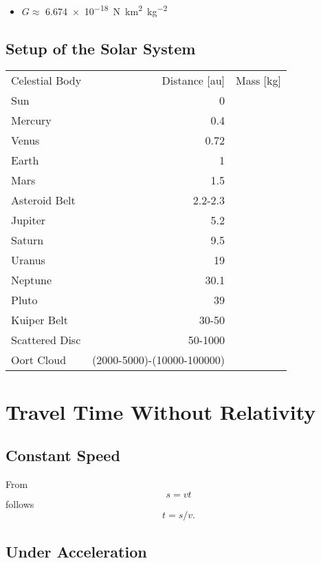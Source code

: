 \documentclass[10pt]{article}
\numberwithin{equation}{section}
\begin{document}
	\begin{itemize}
		\item $G \approx$ \SI{6.674e-18}{\N\km\squared\per\kg\squared}
	\end{itemize}
	
	\subsection{Setup of the Solar System}
	
	\begin{tabular}{l r r}
		Celestial Body & Distance [\unit{\astronomicalunit}] & Mass [\unit{\kg}]\\
		Sun & 0 & \\
		Mercury & 0.4 & \\
		Venus & 0.72 & \\
		Earth & 1 & \\
		Mars & 1.5 & \\
		Asteroid Belt & 2.2-2.3 & \\
		Jupiter & 5.2 & \\
		Saturn & 9.5 & \\
		Uranus & 19 & \\
		Neptune & 30.1 & \\
		Pluto & 39 & \\
		Kuiper Belt & 30-50 & \\
		Scattered Disc & 50-1000 & \\
		Oort Cloud & (2000-5000)-(\num{10000}-\num{100000}) & \\
	\end{tabular}
	
	\section{Travel Time Without Relativity}\label{TravelTime}
	
	\subsection{Constant Speed}
	
	From	
	\begin{equation}
		s = vt	\end{equation}	
	follows
	\begin{equation}
		t = s/v. \end{equation}
	
	\subsection{Under Acceleration}
	
\end{document}
